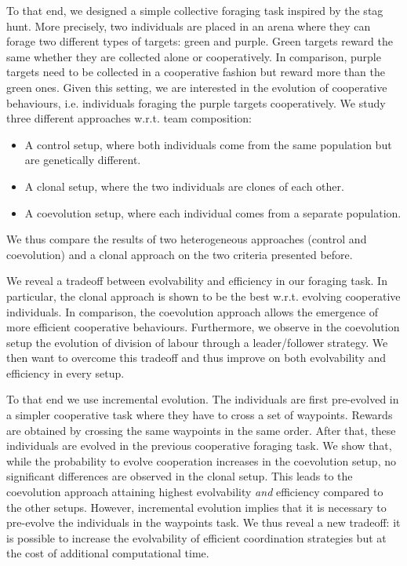 To that end, we designed a simple collective foraging task inspired by the stag hunt. More precisely, two individuals are placed in an arena where they can forage two different types of targets: green and purple. Green targets reward the same whether they are collected alone or cooperatively. In comparison, purple targets need to be collected in a cooperative fashion but reward more than the green ones. Given this setting, we are interested in the evolution of cooperative behaviours, i.e. individuals foraging the purple targets cooperatively. We study three different approaches w.r.t. team composition:

\begin{itemize}
  \item{A control setup, where both individuals come from the same population but are genetically different.}
  \item{A clonal setup, where the two individuals are clones of each other.}
  \item{A coevolution setup, where each individual comes from a separate population.}
\end{itemize}

We thus compare the results of two heterogeneous approaches (control and coevolution) and a clonal approach on the two criteria presented before.

We reveal a tradeoff between evolvability and efficiency in our foraging task. In particular, the clonal approach is shown to be the best w.r.t. evolving cooperative individuals. In comparison, the coevolution approach allows the emergence of more efficient cooperative behaviours. Furthermore, we observe in the coevolution setup the evolution of division of labour through a leader/follower strategy. We then want to overcome this tradeoff and thus improve on both evolvability and efficiency in every setup.

To that end we use incremental evolution. The individuals are first pre-evolved in a simpler cooperative task where they have to cross a set of waypoints. Rewards are obtained by crossing the same waypoints in the same order. After that, these individuals are evolved in the previous cooperative foraging task. We show that, while the probability to evolve cooperation increases in the coevolution setup, no significant differences are observed in the clonal setup. This leads to the coevolution approach attaining highest evolvability \emph{and} efficiency compared to the other setups. However, incremental evolution implies that it is necessary to pre-evolve the individuals in the waypoints task. We thus reveal a new tradeoff: it is possible to increase the evolvability of efficient coordination strategies but at the cost of additional computational time.


